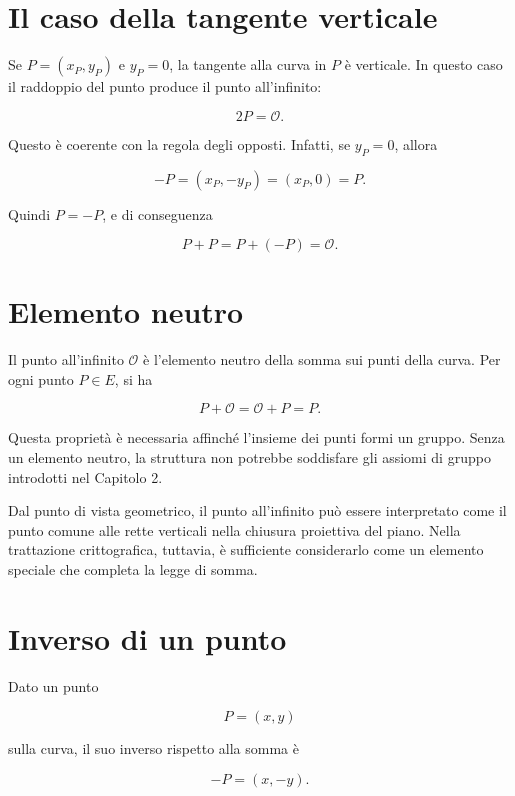 \documentclass[12pt,a4paper,oneside]{report}
\begin{document}
\section{Il caso della tangente verticale}

Se \(P=(x_P,y_P)\) e \(y_P=0\), la tangente alla curva in \(P\) è verticale. In questo caso il raddoppio del punto produce il punto all'infinito:

\begin{equation}
    2P = \mathcal{O}.
\end{equation}

Questo è coerente con la regola degli opposti. Infatti, se \(y_P=0\), allora

\[
-P=(x_P,-y_P)=(x_P,0)=P.
\]

Quindi \(P=-P\), e di conseguenza

\[
P+P=P+(-P)=\mathcal{O}.
\]

\section{Elemento neutro}

Il punto all'infinito \(\mathcal{O}\) è l'elemento neutro della somma sui punti della curva. Per ogni punto \(P \in E\), si ha

\begin{equation}
    P+\mathcal{O}=\mathcal{O}+P=P.
\end{equation}

Questa proprietà è necessaria affinché l'insieme dei punti formi un gruppo. Senza un elemento neutro, la struttura non potrebbe soddisfare gli assiomi di gruppo introdotti nel Capitolo 2.

Dal punto di vista geometrico, il punto all'infinito può essere interpretato come il punto comune alle rette verticali nella chiusura proiettiva del piano. Nella trattazione crittografica, tuttavia, è sufficiente considerarlo come un elemento speciale che completa la legge di somma.

\section{Inverso di un punto}

Dato un punto

\[
P=(x,y)
\]

sulla curva, il suo inverso rispetto alla somma è

\begin{equation}
    -P=(x,-y).
\end{equation}
\end{document}

